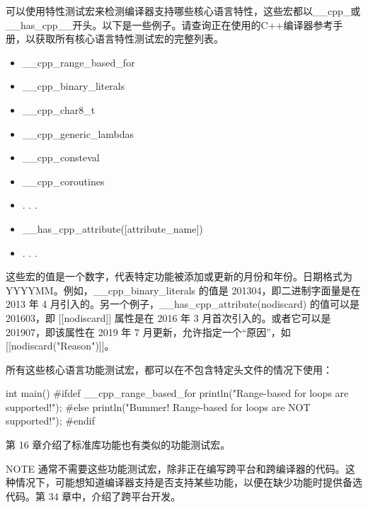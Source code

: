 
可以使用特性测试宏来检测编译器支持哪些核心语言特性，这些宏都以\_\_cpp\_或\_\_has\_cpp\_\_开头。以下是一些例子。请查询正在使用的C++编译器参考手册，以获取所有核心语言特性测试宏的完整列表。

\begin{itemize}
\item
\_\_cpp\_range\_based\_for

\item
\_\_cpp\_binary\_literals

\item
\_\_cpp\_char8\_t

\item
\_\_cpp\_generic\_lambdas

\item
\_\_cpp\_consteval

\item
\_\_cpp\_coroutines

\item
. . .

\item
\_\_has\_cpp\_attribute([attribute\_name])

\item
. . .
\end{itemize}

这些宏的值是一个数字，代表特定功能被添加或更新的月份和年份。日期格式为 YYYYMM。例如，\_\_cpp\_binary\_literals 的值是 201304，即二进制字面量是在 2013 年 4 月引入的。另一个例子，\_\_has\_cpp\_attribute(nodiscard) 的值可以是 201603，即 [[nodiscard]] 属性是在 2016 年 3 月首次引入的。或者它可以是 201907，即该属性在 2019 年 7 月更新，允许指定一个“原因”，如 [[nodiscard("Reason")]]。

所有这些核心语言功能测试宏，都可以在不包含特定头文件的情况下使用：

\begin{cpp}
int main()
{
#ifdef __cpp_range_based_for
    println("Range-based for loops are supported!");
#else
    println("Bummer! Range-based for loops are NOT supported!");
#endif
}
\end{cpp}

第 16 章介绍了标准库功能也有类似的功能测试宏。

\begin{myNotic}{NOTE}
通常不需要这些功能测试宏，除非正在编写跨平台和跨编译器的代码。这种情况下，可能想知道编译器支持是否支持某些功能，以便在缺少功能时提供备选代码。第 34 章中，介绍了跨平台开发。
\end{myNotic}



